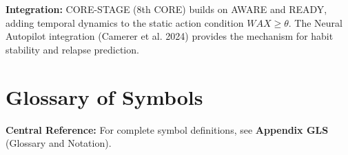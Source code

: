 \begin{tcolorbox}[colback=green!10!white, colframe=green!75!black,
    title=\textbf{Appendix STA: Summary}]
\textbf{Integration:} CORE-STAGE (8th CORE) builds on AWARE and READY, adding temporal dynamics to the static action condition $WAX \geq \theta$. The Neural Autopilot integration (Camerer et al. 2024) provides the mechanism for habit stability and relapse prediction.

\end{tcolorbox}



\section{Glossary of Symbols}
\label{sec:bcj-glossary}

\begin{tcolorbox}[colback=blue!5!white, colframe=blue!75!black]
\textbf{Central Reference:} For complete symbol definitions, see \textbf{Appendix GLS} (Glossary and Notation).
\end{tcolorbox}


